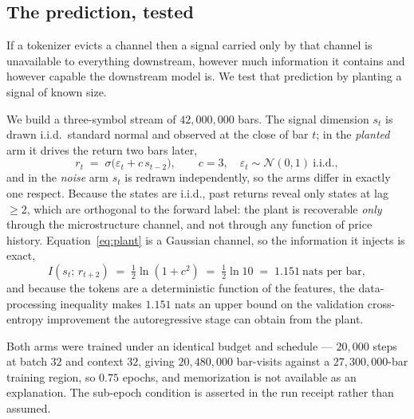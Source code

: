 \subsection{The prediction, tested}
\label{sec:mech-predict}

If a tokenizer evicts a channel then a signal carried only by that channel is unavailable to
everything downstream, however much information it contains and however capable the downstream
model is. We test that prediction by planting a signal of known size.

We build a three-symbol stream of $42{,}000{,}000$ bars. The signal dimension $s_t$ is drawn
i.i.d.\ standard normal and observed at the close of bar $t$; in the \emph{planted} arm it drives
the return two bars later,
\begin{equation}
  r_t \;=\; \sigma\bigl(\varepsilon_t + c\, s_{t-2}\bigr),
  \qquad c = 3, \quad \varepsilon_t \sim \mathcal{N}(0,1) \ \text{i.i.d.},
  \label{eq:plant}
\end{equation}
and in the \emph{noise} arm $s_t$ is redrawn independently, so the arms differ in exactly one
respect. Because the states are i.i.d., past returns reveal only states at lag $\geq 2$, which are
orthogonal to the forward label: the plant is recoverable \emph{only} through the microstructure
channel, and not through any function of price history.
Equation~\eqref{eq:plant} is a Gaussian channel, so the information it injects is exact,
\begin{equation}
  I\!\left(s_{t};\, r_{t+2}\right) \;=\; \tfrac12\ln\!\left(1+c^{2}\right)
  \;=\; \tfrac12\ln 10 \;=\; 1.151 \ \text{nats per bar},
  \label{eq:info}
\end{equation}
and because the tokens are a deterministic function of the features, the data-processing inequality
makes $1.151$ nats an upper bound on the validation cross-entropy improvement the autoregressive
stage can obtain from the plant.

Both arms were trained under an identical budget and schedule --- $20{,}000$ steps at batch $32$
and context $32$, giving $20{,}480{,}000$ bar-visits against a $27{,}300{,}000$-bar training region,
so $0.75$ epochs, and memorization is not available as an explanation. The sub-epoch condition is
asserted in the run receipt rather than assumed.

